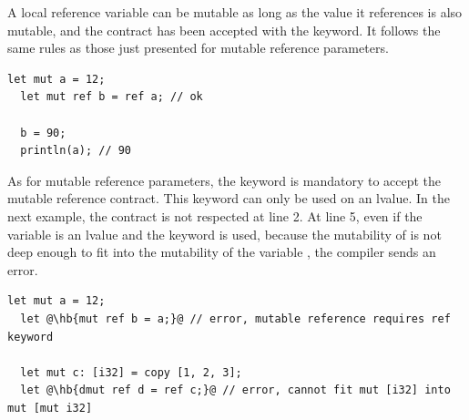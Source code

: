 A local reference variable can be mutable as long as the value it references is
also mutable, and the contract has been accepted with the  keyword.
It follows the same rules as those just presented for mutable reference
parameters.

\begin{lstlisting}[style=coloredverbatim, escapechar=@]
  let mut a = 12;
  let mut ref b = ref a; // ok

  b = 90;
  println(a); // 90
\end{lstlisting}

As for mutable reference parameters, the keyword  is mandatory to
accept the mutable reference contract. This keyword can only be used on an
lvalue. In the next example, the contract is not respected at line 2. At line 5,
even if the variable is an lvalue and the keyword  is used, because
the mutability of  is not deep enough to fit into the mutability of the
variable , the compiler sends an error.

\begin{lstlisting}[style=coloredverbatimError, escapechar=@]
  let mut a = 12;
  let @\hb{mut ref b = a;}@ // error, mutable reference requires ref keyword

  let mut c: [i32] = copy [1, 2, 3];
  let @\hb{dmut ref d = ref c;}@ // error, cannot fit mut [i32] into mut [mut i32]
\end{lstlisting}

\vfill%
\pagebreak
